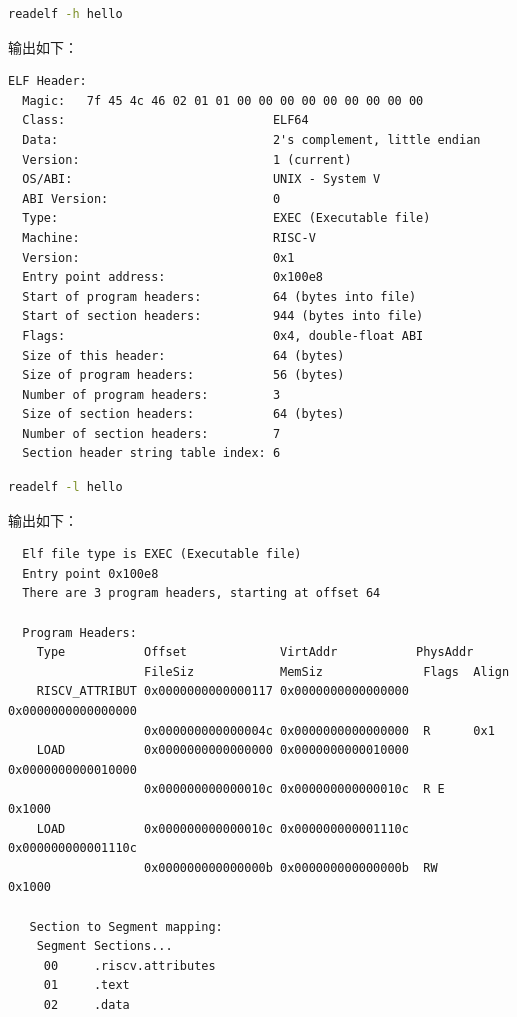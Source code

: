 \documentclass[UTF8]{article}
\begin{document}
\begin{lstlisting}[language=bash]
  readelf -h hello
\end{lstlisting}

输出如下：

\begin{lstlisting}
ELF Header:
  Magic:   7f 45 4c 46 02 01 01 00 00 00 00 00 00 00 00 00 
  Class:                             ELF64
  Data:                              2's complement, little endian
  Version:                           1 (current)
  OS/ABI:                            UNIX - System V
  ABI Version:                       0
  Type:                              EXEC (Executable file)
  Machine:                           RISC-V
  Version:                           0x1
  Entry point address:               0x100e8
  Start of program headers:          64 (bytes into file)
  Start of section headers:          944 (bytes into file)
  Flags:                             0x4, double-float ABI
  Size of this header:               64 (bytes)
  Size of program headers:           56 (bytes)
  Number of program headers:         3
  Size of section headers:           64 (bytes)
  Number of section headers:         7
  Section header string table index: 6
\end{lstlisting}

\begin{lstlisting}[language=bash]
  readelf -l hello
\end{lstlisting}

输出如下：

\begin{lstlisting}
  Elf file type is EXEC (Executable file)
  Entry point 0x100e8
  There are 3 program headers, starting at offset 64
  
  Program Headers:
    Type           Offset             VirtAddr           PhysAddr
                   FileSiz            MemSiz              Flags  Align
    RISCV_ATTRIBUT 0x0000000000000117 0x0000000000000000 0x0000000000000000
                   0x000000000000004c 0x0000000000000000  R      0x1
    LOAD           0x0000000000000000 0x0000000000010000 0x0000000000010000
                   0x000000000000010c 0x000000000000010c  R E    0x1000
    LOAD           0x000000000000010c 0x000000000001110c 0x000000000001110c
                   0x000000000000000b 0x000000000000000b  RW     0x1000
  
   Section to Segment mapping:
    Segment Sections...
     00     .riscv.attributes 
     01     .text 
     02     .data
\end{lstlisting}
\end{document}
